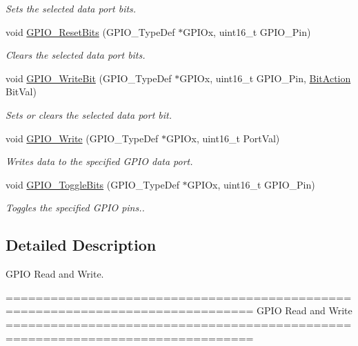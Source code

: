 \begin{DoxyCompactItemize}
\begin{DoxyCompactList}\small\item\em Sets the selected data port bits. \end{DoxyCompactList}\item 
void \hyperlink{group___g_p_i_o___group2_ga6fcd35b207a66608dd2c9d7de9247dc8}{G\-P\-I\-O\-\_\-\-Reset\-Bits} (G\-P\-I\-O\-\_\-\-Type\-Def $\ast$G\-P\-I\-Ox, uint16\-\_\-t G\-P\-I\-O\-\_\-\-Pin)
\begin{DoxyCompactList}\small\item\em Clears the selected data port bits. \end{DoxyCompactList}\item 
void \hyperlink{group___g_p_i_o___group2_ga8f7b237fd744d9f7456fbe0da47a9b80}{G\-P\-I\-O\-\_\-\-Write\-Bit} (G\-P\-I\-O\-\_\-\-Type\-Def $\ast$G\-P\-I\-Ox, uint16\-\_\-t G\-P\-I\-O\-\_\-\-Pin, \hyperlink{group___g_p_i_o_ga176130b21c0e719121470a6042d4cf19}{Bit\-Action} Bit\-Val)
\begin{DoxyCompactList}\small\item\em Sets or clears the selected data port bit. \end{DoxyCompactList}\item 
void \hyperlink{group___g_p_i_o___group2_gaa925f19c8547a00c7a0c269a84873bf9}{G\-P\-I\-O\-\_\-\-Write} (G\-P\-I\-O\-\_\-\-Type\-Def $\ast$G\-P\-I\-Ox, uint16\-\_\-t Port\-Val)
\begin{DoxyCompactList}\small\item\em Writes data to the specified G\-P\-I\-O data port. \end{DoxyCompactList}\item 
void \hyperlink{group___g_p_i_o___group2_gac1b837c66258872740d5f89f23549ab1}{G\-P\-I\-O\-\_\-\-Toggle\-Bits} (G\-P\-I\-O\-\_\-\-Type\-Def $\ast$G\-P\-I\-Ox, uint16\-\_\-t G\-P\-I\-O\-\_\-\-Pin)
\begin{DoxyCompactList}\small\item\em Toggles the specified G\-P\-I\-O pins.. \end{DoxyCompactList}\end{DoxyCompactItemize}


\subsection{Detailed Description}
G\-P\-I\-O Read and Write. \begin{DoxyVerb} ===============================================================================
                              GPIO Read and Write
 ===============================================================================  \end{DoxyVerb}
 

